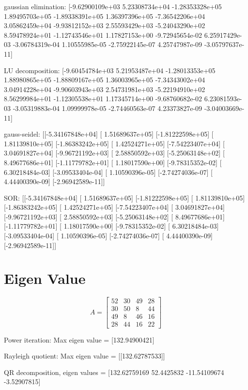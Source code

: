 \documentclass[conference]{IEEEtran}
\begin{document}
gaussian elimination:  [-9.62900109e+03  5.23308734e+04 -1.28353328e+05  1.89495703e+05
-1.89338391e+05  1.36397396e+05 -7.36542206e+04  3.05862459e+04
-9.93812152e+03  2.55593429e+03 -5.24043290e+02  8.59478924e+01
-1.12743546e+01  1.17827153e+00 -9.72945654e-02  6.25917429e-03
-3.06784319e-04  1.10555985e-05 -2.75922145e-07  4.25747987e-09
-3.05797637e-11]


LU decomposition:  [-9.60454784e+03  5.21953487e+04 -1.28013353e+05  1.88980865e+05
-1.88809167e+05  1.36003965e+05 -7.34343002e+04  3.04914228e+04
-9.90603943e+03  2.54731981e+03 -5.22194910e+02  8.56299984e+01
-1.12305538e+01  1.17345714e+00 -9.68760682e-02  6.23081593e-03
-3.05319883e-04  1.09999978e-05 -2.74460563e-07  4.23373827e-09
-3.04003669e-11]


gauss-seidel:  [[-5.34167848e+04]
[ 1.51689637e+05]
[-1.81222598e+05]
[ 1.81139810e+05]
[-1.86383242e+05]
[ 1.42524271e+05]
[-7.54223407e+04]
[ 3.04691827e+04]
[-9.96721192e+03]
[ 2.58850592e+03]
[-5.25063148e+02]
[ 8.49677686e+01]
[-1.11779782e+01]
[ 1.18017590e+00]
[-9.78315352e-02]
[ 6.30218484e-03]
[-3.09533404e-04]
[ 1.10590396e-05]
[-2.74274036e-07]
[ 4.44400390e-09]
[-2.96942589e-11]]


SOR:  [[-5.34167848e+04]
[ 1.51689637e+05]
[-1.81222598e+05]
[ 1.81139810e+05]
[-1.86383242e+05]
[ 1.42524271e+05]
[-7.54223407e+04]
[ 3.04691827e+04]
[-9.96721192e+03]
[ 2.58850592e+03]
[-5.25063148e+02]
[ 8.49677686e+01]
[-1.11779782e+01]
[ 1.18017590e+00]
[-9.78315352e-02]
[ 6.30218484e-03]
[-3.09533404e-04]
[ 1.10590396e-05]
[-2.74274036e-07]
[ 4.44400390e-09]
[-2.96942589e-11]]

\section{Eigen Value}

$$
A = \begin{bmatrix}
52 & 30 & 49 & 28\\
30 & 50 & 8 & 44\\
49 & 8 & 46 & 16\\
28 & 44 & 16 & 22
\end{bmatrix}
$$

Power iteration: Max eigen value =  [132.94900421]

Rayleigh quotient: Max eigen value =  [[132.62787533]]

QR decomposition, eigen values =  [132.62759169  52.4425832  -11.54109674  -3.52907815]
\end{document}
